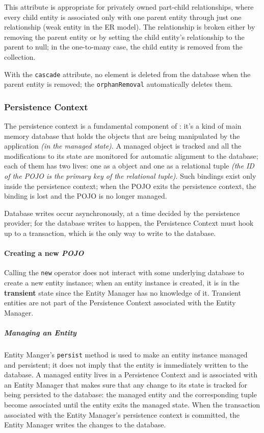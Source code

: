 \documentclass[english]{article}
\begin{document}
This attribute is appropriate for privately owned part-child relationships, where every child entity is associated only with one parent entity through just one relationship (weak entity in the ER model).
The relationship is broken either by removing the parent entity or by setting the child entity's relationship to the parent to null;
in the one-to-many case, the child entity is removed from the collection.

With the \texttt{cascade} attribute, no element is deleted from the database when the parent entity is removed;
the \texttt{orphanRemoval} automatically deletes them.

\subsubsection{Persistence Context}

The persistence context is a fundamental component of \jpa:
it's a kind of main memory database that holds the objects that are being manipulated by the application \textit{(in the managed state)}.
A managed object is tracked and all the modifications to its state are monitored for automatic alignment to the database;
each of them has two lives: one as a \java object and one as a relational tuple \textit{(the ID of the POJO is the primary key of the relational tuple)}.
Such bindings exist only inside the persistence context;
when the POJO exits the persistence context, the binding is lost and the POJO is no longer managed.

Database writes occur asynchronously, at a time decided by the persistence provider;
for the database writes to happen, the Persistence Context must hook up to a transaction, which is the only way to write to the database.

\paragraph{Creating a new \textit{POJO}}

Calling the \texttt{new} operator does not interact with some underlying database to create a new entity instance;
when an entity instance is created, it is in the \textbf{transient} state since the Entity Manager has no knowledge of it.
Transient entities are not part of the Persistence Context associated with the Entity Manager.

\subparagraph*{Managing an Entity}
Entity Manger's \texttt{persist} method is used to make an entity instance managed and persistent; it does not imply that the entity is immediately written to the database.
A managed entity lives in a Persistence Context and is associated with an Entity Manager that makes sure that any change to its state is tracked for being persisted to the database:
the managed entity and the corresponding tuple become associated until the entity exits the managed state.
When the transaction associated with the Entity Manager's persistence context is committed, the Entity Manager writes the changes to the database.
\end{document}
